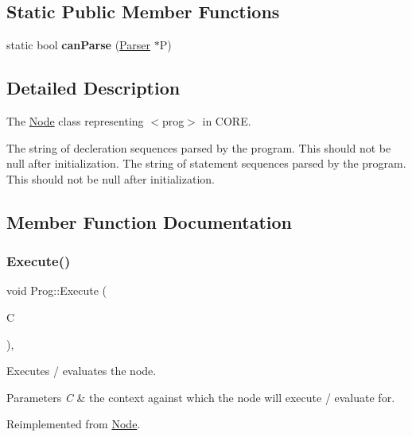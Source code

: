 \subsection*{Static Public Member Functions}
\begin{DoxyCompactItemize}
\item 
\mbox{\label{class_prog_a04ee2af6f860b8533f9c6936d9735abd}} 
static bool {\bfseries can\+Parse} (\mbox{\hyperlink{class_parser}{Parser}} $\ast$P)
\end{DoxyCompactItemize}


\subsection{Detailed Description}
The \mbox{\hyperlink{class_node}{Node}} class representing {\ttfamily $<$prog$>$} in C\+O\+RE. 

The string of decleration sequences parsed by the program. This should not be null after initialization. The string of statement sequences parsed by the program. This should not be null after initialization. 

\subsection{Member Function Documentation}
\mbox{\label{class_prog_afd95e341f8003d6b5fe6369af3b8975b}} 
\subsubsection{\texorpdfstring{Execute()}{Execute()}}
{\footnotesize\ttfamily void Prog\+::\+Execute (\begin{DoxyParamCaption}\item[{\mbox{\hyperlink{class_a_s_t_context}{A\+S\+T\+Context}} \&}]{C }\end{DoxyParamCaption})\hspace{0.3cm}{\ttfamily [override]}, {\ttfamily [virtual]}}

Executes / evaluates the node. 
\begin{DoxyParams}{Parameters}
{\em C} & the context against which the node will execute / evaluate for. \\
\hline
\end{DoxyParams}


Reimplemented from \mbox{\hyperlink{class_node_a27ad1ba81d2596817b361368282bcbfa}{Node}}.

